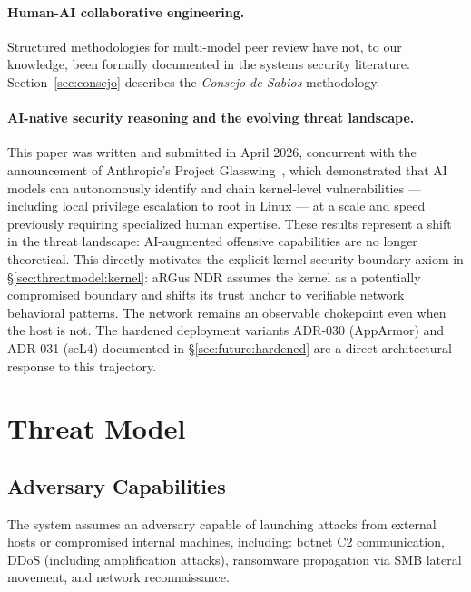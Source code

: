 \documentclass[11pt,a4paper]{article}
\begin{document}
    \paragraph{Human-AI collaborative engineering.}
    Structured methodologies for multi-model peer review have not, to our knowledge, been
    formally documented in the systems security literature. Section~\ref{sec:consejo} describes
    the \emph{Consejo de Sabios} methodology.

    \paragraph{AI-native security reasoning and the evolving threat landscape.}
    This paper was written and submitted in April 2026, concurrent with the
    announcement of Anthropic's Project Glasswing~\cite{anthropic2026glasswing},
    which demonstrated that AI models can autonomously identify and chain
    kernel-level vulnerabilities --- including local privilege escalation to
    root in Linux --- at a scale and speed previously requiring specialized
    human expertise. These results represent a shift in the threat landscape:
    AI-augmented offensive capabilities are no longer theoretical.
    This directly motivates the explicit kernel security boundary axiom in
    \S\ref{sec:threatmodel:kernel}: aRGus NDR assumes the kernel as a
    potentially compromised boundary and shifts its trust anchor to
    verifiable network behavioral patterns. The network remains an observable
    chokepoint even when the host is not. The hardened deployment variants
    ADR-030 (AppArmor) and ADR-031 (seL4) documented in
    \S\ref{sec:future:hardened} are a direct architectural response to this
    trajectory.
    \section{Threat Model}

    \subsection{Adversary Capabilities}
    The system assumes an adversary capable of launching attacks from external hosts or
    compromised internal machines, including: botnet C2 communication, DDoS (including
    amplification attacks), ransomware propagation via SMB lateral movement, and network
    reconnaissance.
\end{document}
